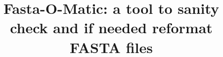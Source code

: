\documentclass{bmcart}
\begin{document}
\begin{frontmatter}

\begin{fmbox}


\title{Fasta-O-Matic: a tool to sanity check and if needed reformat FASTA files}

\author[
   addressref={aff1},                   %
   corref={aff1},
   email={sheltonj@ksu.edu}   %
]{ }
\author[
   addressref={aff1},
   email={sjbrown@ksu.edu} %
]{ }


\address[id=aff1]{%
  , %
  ,                              %
}




\end{fmbox}
\end{frontmatter}
\end{document}
